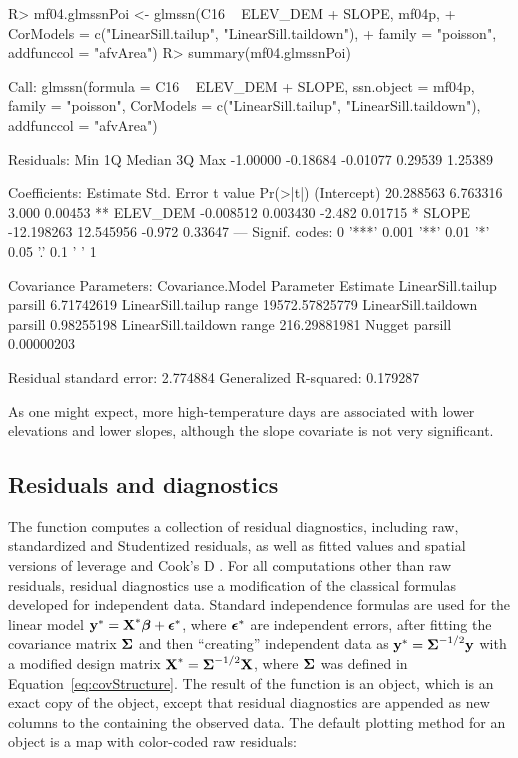\documentclass[nojss]{jss}
\renewenvironment{Schunk}{\vspace{\topsep}}{\vspace{\topsep}}
\def\bbeta{\mbox{\boldmath $\beta$}}
\def\bepsilon{\mbox{\boldmath $\epsilon$}}
\def\bSigma{\mbox{\boldmath $\Sigma$}}
\def\by{\textbf{y}}
\def\bX{\textbf{X}}
\begin{document}
\begin{Schunk}
\begin{Sinput}
R> mf04.glmssnPoi <- glmssn(C16 ~ ELEV_DEM + SLOPE, mf04p,
+    CorModels = c("LinearSill.tailup", "LinearSill.taildown"),
+    family = "poisson", addfunccol = "afvArea")
R> summary(mf04.glmssnPoi)
\end{Sinput}
\begin{Soutput}
Call:
glmssn(formula = C16 ~ ELEV_DEM + SLOPE, ssn.object = mf04p, 
    family = "poisson", CorModels = c("LinearSill.tailup", "LinearSill.taildown"), 
    addfunccol = "afvArea")

Residuals:
     Min       1Q   Median       3Q      Max 
-1.00000 -0.18684 -0.01077  0.29539  1.25389 

Coefficients:
              Estimate Std. Error t value Pr(>|t|)   
(Intercept)  20.288563   6.763316   3.000  0.00453 **
ELEV_DEM     -0.008512   0.003430  -2.482  0.01715 * 
SLOPE       -12.198263  12.545956  -0.972  0.33647   
---
Signif. codes:  0 '***' 0.001 '**' 0.01 '*' 0.05 '.' 0.1 ' ' 1

Covariance Parameters:
    Covariance.Model Parameter       Estimate
   LinearSill.tailup   parsill     6.71742619
   LinearSill.tailup     range 19572.57825779
 LinearSill.taildown   parsill     0.98255198
 LinearSill.taildown     range   216.29881981
              Nugget   parsill     0.00000203

Residual standard error: 2.774884
Generalized R-squared: 0.179287
\end{Soutput}
\end{Schunk}

As one might expect, more high-temperature days are associated with
lower elevations and lower slopes, although the slope covariate is not
very significant.


\subsection{Residuals and diagnostics}

The  function computes a collection of residual
diagnostics, including raw, standardized and Studentized residuals, as
well as fitted values and spatial versions of leverage and Cook's D
\citep{Cook:Weis:resi:1982}. For all computations other than raw
residuals, residual diagnostics use a modification of the classical
formulas developed for independent data. Standard independence
formulas are used for the linear model $\by^* = \bX^*\bbeta +
\bepsilon^*$, where $\bepsilon^*$ are independent errors, after
fitting the covariance matrix $\bSigma$ and then ``creating''
independent data as $\by^*=\bSigma^{-1/2}\by$ with a modified design
matrix $\bX^*=\bSigma^{-1/2}\bX$, where $\bSigma$ was defined in
Equation~\ref{eq:covStructure}. The result of the 
function is an  object, which is an exact copy of
the  object, except that residual diagnostics are
appended as new columns to the  
containing the observed data. The default plotting method for an
 object is a map with color-coded raw residuals:
\end{document}
